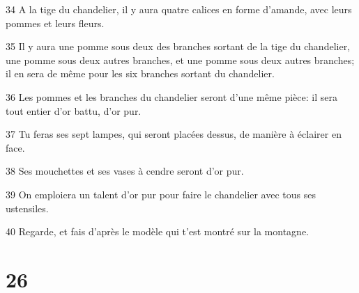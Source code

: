 \par 34 A la tige du chandelier, il y aura quatre calices en forme d'amande, avec leurs pommes et leurs fleurs.
\par 35 Il y aura une pomme sous deux des branches sortant de la tige du chandelier, une pomme sous deux autres branches, et une pomme sous deux autres branches; il en sera de même pour les six branches sortant du chandelier.
\par 36 Les pommes et les branches du chandelier seront d'une même pièce: il sera tout entier d'or battu, d'or pur.
\par 37 Tu feras ses sept lampes, qui seront placées dessus, de manière à éclairer en face.
\par 38 Ses mouchettes et ses vases à cendre seront d'or pur.
\par 39 On emploiera un talent d'or pur pour faire le chandelier avec tous ses ustensiles.
\par 40 Regarde, et fais d'après le modèle qui t'est montré sur la montagne.

\chapter{26}

